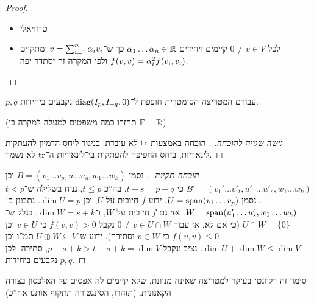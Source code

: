 \documentclass[name=רשימות אלגברה לינארית 2א]{../../../tex/classes/megasumPreamble}
\begin{document}
	\begin{proof}\,
		\begin{itemize}
			\item[$\impliedby$] טרוויאלי
			\item[$\implies$] לכל $0 \neq v \in V$ קיימים ויחידים $\alpha_1 \dots \alpha_n \in \mathbb{R}$ כך ש־$v = \sum^n_{i = 1} \alpha_i v_i$ ומתקיים $f(v, v) = \alpha_i^2 f(v_{i}, v_i)$ ולפי המקרה זה יסתדר יפה. 
		\end{itemize}\envendproof
	\end{proof}
	
	\begin{Theorem}
		$p, q$ עבורם המטריצה הסימטרית חופפת ל־$\operatorname{diag}(I_p, I_{-q}, 0)$ נקבעים ביחידות. 
	\end{Theorem}
	(תחזרו כמה משפטים למעלה למקרה בו $\mathbb{F} = \mathbb{R}$)
	\begin{proof}[גישה שגויה להוכחה. ]
		הוכחה באמצעות $\operatorname{tr}$ לא עובדת. בניגוד ליחס הדמיון להעתקות לינאריות, ביחס החפיפה להעתקות בי־לינאריות ה־$\operatorname{tr}$ לא נשמר. 
	\end{proof}
	\begin{proof}[הוכחה תקינה. ]
		נסמן $B = (v_1 \dots v_p, u \dots u_q, w_1 \dots w_k)$ וכן $B' = (v_1' \dots v'_t, u'_1 \dots u'_s, w_1 \dots w_k)$ כי $t + s = p + q$. בה''כ $t \le p$, נניח בשלילה ש־$t < p$. נסמן $U = \operatorname{span}(v_1 \dots v_p)$. ידוע $f$ חיובית על $U$, וכן $\dim U = p$. נתבונן ב־$W = \operatorname{span}(u_1' \dots u_s', w_1 \dots w_k)$. אזי גם $f$ חיובית על $W$, ו־$\dim W = s + k$. בגלל ש־$U \cap W = \{0\}$ (כי אם לא, אז עבור $0 \neq v \in U \cap W$ נקבל $f(v, v) > 0$ כי $v \in U$ וכן $f(v, v) \le 0$ כי $v \in W$ וסתירה). ידוע ש־$U \oplus W \subseteq V$ תמ''ו וכן $\dim U + \dim W \le \dim V$. נציב ונקבל $p + s + k > t + s + k = \dim V$, סתירה. לכן $p, q$ נקבעים ביחידות. 
	\end{proof}
	
	סימון זה רלוונטי בעיקר למטריצה שאינה מנוונת, שלא קיימים לה אפסים על האלכסון בצורה הקאנונית. 
	(תזהרו, הסינגטורה תתקוף אותנו אח''כ)
	
\end{document}
